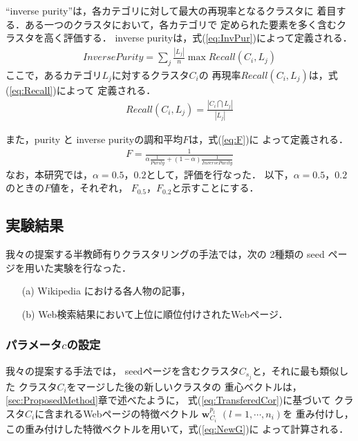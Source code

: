 \documentclass[japanese]{jnlp_1.4}
\begin{document}
``inverse purity''は，各カテゴリに対して最大の再現率となるクラスタに
着目する．ある一つのクラスタにおいて，各カテゴリで
定められた要素を多く含むクラスタを高く評価する．
inverse purityは，式(\ref{eq:InvPur})によって定義される．
\begin{eqnarray}
Inverse Purity=\sum_{j}\frac{|L_{j}|}{n}\max Recall(C_{i}, L_{j}) \label{eq:InvPur} 
\end{eqnarray}
ここで，あるカテゴリ$L_{j}$に対するクラスタ$C_{i}$の
再現率$Recall(C_{i},L_{j})$は，式(\ref{eq:Recall})によって
定義される．
\begin{eqnarray}
Recall(C_{i},L_{j})=\frac{|C_{i}\bigcap L_{j}|}{|L_{j}|} \label{eq:Recall}
\end{eqnarray}

また，purity と inverse purityの調和平均$F$は，式(\ref{eq:F})に
よって定義される．
\begin{eqnarray}
F=\frac{1}{\alpha\frac{1}{Purity}+(1-\alpha)\frac{1}{InversePurity}} \label{eq:F}
\end{eqnarray}
なお，本研究では，$\alpha=0.5$，$0.2$として，評価を行なった．
以下，$\alpha=0.5$，$0.2$のときの$F$値を，それぞれ，
$F_{0.5}$，$F_{0.2}$と示すことにする．


\subsection{実験結果}
\label{subsec:ExpResults}

我々の提案する半教師有りクラスタリングの手法では，次の
2種類の seed ページを用いた実験を行なった．
\begin{itemize}
 \item[(a)] Wikipedia \cite{Remy02} における各人物の記事，
 \item[(b)] Web検索結果において上位に順位付けされたWebページ．
\end{itemize} 


    \subsubsection{パラメータ$c$の設定}

我々の提案する手法では，
seedページを含むクラスタ$C_{s_{j}}$と，それに最も類似した
クラスタ$C_{i}$をマージした後の新しいクラスタの
重心ベクトルは，\ref{sec:ProposedMethod}章で述べたように，
式(\ref{eq:TransferedCor})に基づいて
クラスタ$C_{i}$に含まれるWebページの特徴ベクトル
$\boldsymbol{w}^{p_{l}}_{C_{i}}$ $(l=1,\cdots ,n_{i})$を
重み付けし，この重み付けした特徴ベクトルを用いて，式(\ref{eq:NewG})に
よって計算される．
\end{document}
